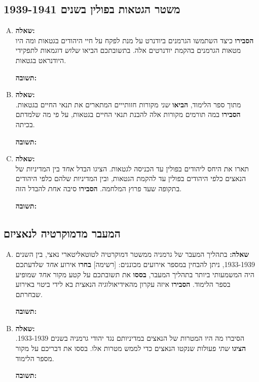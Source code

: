 \documentclass[a4paper]{article}
\begin{document}
	\renewcommand{\footrule}{\rule{\linewidth-26pt}{0.25pt}\vspace{-5pt}}
		
	\subsection{משטר הגטאות בפולין בשנים 1939-1941}
		\begin{enumerate}[A.]
			\item \textbf{שאלה: }\\
			\textbf{הסבירו} כיצד השתמשו הגרמנים ביודנרט על מנת לפקח על חיי היהודים בגטאות ומה היו מטאות הגרמנים בהקמת יודנרטים אלה. בתשובתכם הביאו \textit{שלוש} דוגמאות לתפקידי היודנראט בגטאות. 
			
			\textbf{תשובה: }\\
			
			\item \textbf{שאלה: }\\
			מתוך ספר הלימוד, \textbf{הביאו} \textit{שני} מקורות חזותייים המתארים את תנאי החיים בגטאות. \textbf{הסבירו} במה תורמים מקורות אלה להבנת תנאי החיים בגטאות, על פי מה שלמדתם בכיתה. 
			
			\textbf{תשובה: }\\
			
			\item \textbf{שאלה: }\\
			תארו את היחס ליהודים בפולין עד הכניסה לגטאות. הציגו הבדל \textit{אחד} בין המדיניות של הנאצים כלפי היהודים בפולין עד להקמת הגטאות, ובין המדיניות שלהם כלפי היהודים בתקופה שעד פרוץ המלחמה. \textbf{הסבירו} סיבה \textit{אחת} להבדל הזה. 
			
			\textbf{תשובה: }\\
			
		\end{enumerate}
	
	\subsection{המעבר מדמוקרטיה לנאציזם}
		\begin{enumerate}[A.]
			\item \textbf{שאלה: }
			בתהליך המעבר של גרמניה ממשטר דמוקרטיה לטוטאליטארי נאצי, בין השנים 1933-1939, ניתן להבחין במספר אירועים מכוננים: [רשימה] \textbf{בחרו} אירוע \textit{אחד} שלדעתכם היה המשמעותי ביותר בתהליך המעבר, \textbf{בססו} את תשובתכם על קטע מקור \textit{אחד} שמופיע בספר הלימוד. \textbf{הסבירו} איזה עקרון מהאידיאולוגיה הנאצית בא לידי ביטוי באירוע שבחרתם. 
			
			\textbf{תשובה: }\\
			
			\item \textbf{שאלה: }\\
			הסיברו מה היו המטרות של הנאצים במדיניותם נגד יהודי גרמניה בשנים 1933-1939. \textbf{הציגו} \textit{שתי} פעולות שנקטו הנאצים כדי לממש מטרות אלו. בססו את דבריכם על מקור מספר הלימוד. 
			
			\textbf{תשובה: }\\
			
		\end{enumerate}
\end{document}
